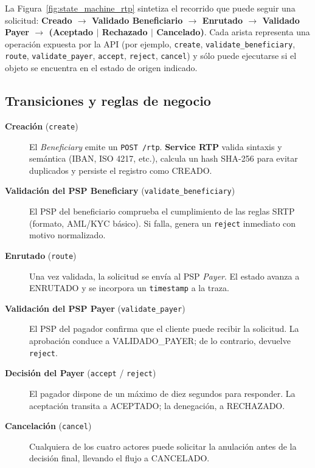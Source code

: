 La Figura~\ref{fig:state_machine_rtp} sintetiza el recorrido que puede seguir una solicitud:  
\textbf{Creado $\rightarrow$ Validado Beneficiario $\rightarrow$ Enrutado $\rightarrow$ Validado Payer $\rightarrow$ (Aceptado $|$ Rechazado $|$ Cancelado)}.  
Cada arista representa una operación expuesta por la API (por ejemplo, \texttt{create}, \texttt{validate\_beneficiary}, \texttt{route}, \texttt{validate\_payer}, \texttt{accept}, \texttt{reject}, \texttt{cancel}) y sólo puede ejecutarse si el objeto se encuentra en el estado de origen indicado.

\subsection{Transiciones y reglas de negocio}

\begin{description}
  \item[\textbf{Creación} (\texttt{create})]  
        El \emph{Beneficiary} emite un \texttt{POST /rtp}. \textbf{Service RTP} valida sintaxis y semántica (IBAN, ISO 4217, etc.), calcula un hash SHA-256 para evitar duplicados y persiste el registro como \textsc{CREADO}.
  \item[\textbf{Validación del PSP Beneficiary} (\texttt{validate\_beneficiary})]  
        El PSP del beneficiario comprueba el cumplimiento de las reglas SRTP (formato, AML/KYC básico). Si falla, genera un \texttt{reject} inmediato con motivo normalizado.
  \item[\textbf{Enrutado} (\texttt{route})]  
        Una vez validada, la solicitud se envía al PSP \emph{Payer}. El estado avanza a \textsc{ENRUTADO} y se incorpora un \texttt{timestamp} a la traza.
  \item[\textbf{Validación del PSP Payer} (\texttt{validate\_payer})]  
        El PSP del pagador confirma que el cliente puede recibir la solicitud. La aprobación conduce a \textsc{VALIDADO\_PAYER}; de lo contrario, devuelve \texttt{reject}.
  \item[\textbf{Decisión del Payer} (\texttt{accept} / \texttt{reject})]  
        El pagador dispone de un máximo de diez segundos para responder. La aceptación transita a \textsc{ACEPTADO}; la denegación, a \textsc{RECHAZADO}.
  \item[\textbf{Cancelación} (\texttt{cancel})]  
        Cualquiera de los cuatro actores puede solicitar la anulación antes de la decisión final, llevando el flujo a \textsc{CANCELADO}.
\end{description}

